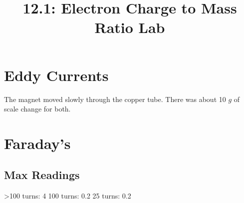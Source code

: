 \documentclass{article}
\title{12.1: Electron Charge to Mass Ratio Lab}
\begin{document}
\section*{Eddy Currents}
The magnet moved slowly through the copper tube.
There was about 10 $g$ of scale change for both.
\section*{Faraday's}
\subsection*{Max Readings}
>100 turns: 4
100 turns: 0.2
25 turns: 0.2
\end{document}
